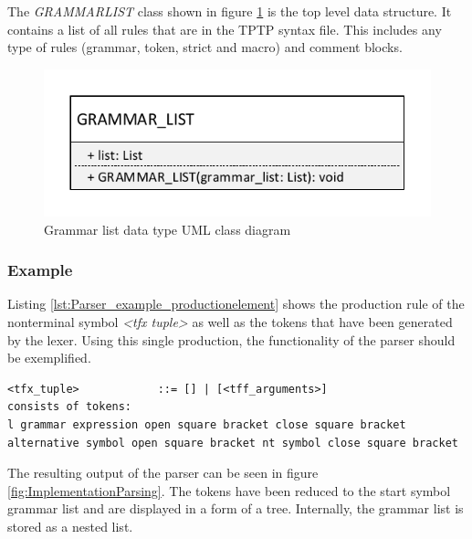 The \textit{GRAMMAR\textunderscore LIST} class shown in figure \ref{fig:ConceptGrammarListClassDiagram} is the top level data structure. It contains a list of all rules that are in the \ac{TPTP} syntax file.
This includes any type of rules (grammar, token, strict and macro) and comment blocks. 

\begin{figure}[H]
\centering
\includegraphics[width=.5\textwidth]{images/Concept_uml_data_types_grammar_list.pdf}
\caption{Grammar list data type UML class diagram}
\label{fig:ConceptGrammarListClassDiagram}
\end{figure}

\subsubsection{Example}
Listing \ref{lst:Parser_example_productionelement} shows the production rule of the nonterminal symbol \textit{<tfx tuple>} as well as the tokens that have been generated by the lexer. Using this single production, the functionality of the parser should be exemplified. \\

\begin{lstlisting}[basicstyle=\scriptsize, caption= Production element, label= lst:Parser_example_productionelement]
<tfx_tuple>            ::= [] | [<tff_arguments>]
consists of tokens:
l grammar expression open square bracket close square bracket alternative symbol open square bracket nt symbol close square bracket
\end{lstlisting}

The resulting output of the parser can be seen in figure \ref{fig:ImplementationParsing}. The tokens have been reduced to the start symbol grammar list and are displayed in a form of a tree. Internally, the grammar list is stored as a nested list.

